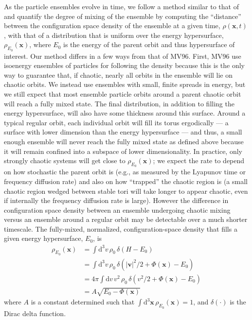 \documentclass[letterpaper,12pt,preprint]{aastex}
\newcommand{\dd}{\mathrm{d}}
\newcommand{\bs}[1]{\boldsymbol{#1}}
\begin{document}
As the particle ensembles evolve in time, we follow a method similar to that of \citet[][hereafter MV96]{merritt96} and quantify the degree of mixing of the ensemble by computing the ``distance'' between the configuration space density of the ensemble at a given time, $\rho(\bs{x},t)$, with that of a distribution that is uniform over the energy hypersurface, $\rho_{E_0}(\bs{x})$, where $E_0$ is the energy of the parent orbit and thus hypersurface of interest. Our method differs in a few ways from that of MV96. First, MV96 use isoenergy ensembles of particles for following the density because this is the only way to guarantee that, if chaotic, nearly all orbits in the ensemble will lie on chaotic orbits. We instead use ensembles with small, finite spreads in energy, but we still expect that most ensemble particle orbits around a parent chaotic orbit will reach a fully mixed state. The final distribution, in addition to filling the energy hypersurface, will also have some thickness around this surface. Around a typical regular orbit, each individual orbit will fill its torus ergodically --- a surface with lower dimension than the energy hypersurface --- and thus, a small enough ensemble will never reach the fully mixed state as defined above because it will remain confined into a subspace of lower dimensionality. In practice, only strongly chaotic systems will get close to $\rho_{E_0}(\bs{x})$; we expect the rate to depend on how stochastic the parent orbit is (e.g., as measured by the Lyapunov time or frequency diffusion rate) and also on how ``trapped'' the chaotic region is (a small chaotic region wedged between stable tori will take longer to appear chaotic, even if internally the frequency diffusion rate is large). However the difference in configuration space density between an ensemble undergoing chaotic mixing versus an ensemble around a regular orbit may be detectable over a much shorter timescale. The fully-mixed, normalized, configuration-space density that fills a given energy hypersurface, $E_0$, is 
\begin{align}
	\rho_{E_0}(\bs{x}) &= \int \dd^3v \, \rho_0 \, \delta(H - E_0)\\
	&= \int \dd^3v \, \rho_0 \, \delta\left(|\bs{v}|^2/2 + \Phi(\bs{x}) - E_0\right)\\
	&= 4\pi \int \dd v \, v^2 \, \rho_0 \, \delta\left(v^2/2 + \Phi(\bs{x}) - E_0\right)\\
	&= A \sqrt{E_0 - \Phi(\bs{x})}\label{eq:mixeddensity}
\end{align}
where $A$ is a constant determined such that $\int \dd^3\bs{x} \, \rho_{E_0}(\bs{x}) = 1$, and $\delta(\cdot)$ is the Dirac delta function. 
\end{document}
